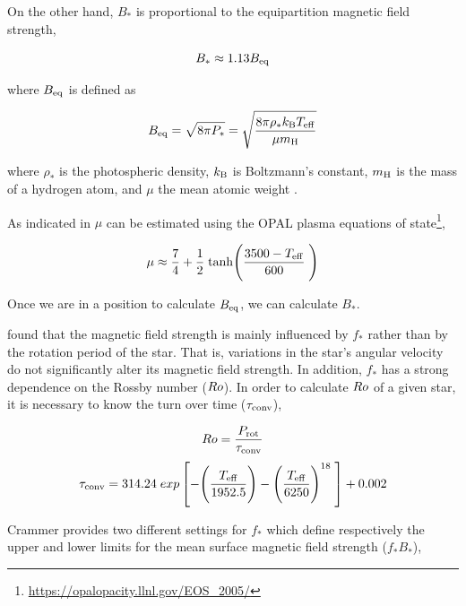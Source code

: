 \documentclass[fleqn,usenatbib]{mnras}
\begin{document}
On the other hand, $B_*$ is proportional to the equipartition magnetic field strength,
\begin{ceqn}
\begin{equation}
    B_* \approx 1.13 B_{\mathrm{eq}} \label{eq:mf_bstar}
\end{equation}
\end{ceqn}
where $B_{\mathrm{eq}}$ is defined as 
\begin{ceqn}
\begin{equation}
    B_{\mathrm{eq}} = \sqrt{8\pi P_*} = \sqrt{\frac{8\pi\rho_* k_{\mathrm{B}} T_{\mathrm{eff}}}{\mu m_{\mathrm{H}}}}\label{eq:mf_beq}    
\end{equation}
\end{ceqn}
where $\rho_*$ is the photospheric density, $k_{\mathrm{B}}$ is Boltzmann's constant, $m_{\mathrm{H}}$ is the mass of a hydrogen atom, and $\mu$ the mean atomic weight \citep{Cranmer2011}.

As indicated in \cite{Cranmer2011} $\mu$ can be estimated using the OPAL plasma equations of state\footnote{\url{https://opalopacity.llnl.gov/EOS_2005/}},
\begin{ceqn}
\begin{equation}
    \mu \approx \frac{7}{4} + \frac{1}{2} \; {\rm tanh}\Bigg(\frac{3500-T_{\mathrm{eff}}}{600}\;\Bigg) \label{eq:mf_atom_weight}
\end{equation}
\end{ceqn}
Once we are in a position to calculate $B_{\mathrm{eq}}$, we can calculate $B_*$.\par

\cite{Cranmer2011} found that the magnetic field strength is mainly influenced by $f_*$ rather than by the rotation period of the star. That is, variations in the star's angular velocity do not significantly alter its magnetic field strength. In addition, $f_*$ has a strong dependence on the Rossby number ($Ro$). In order to calculate $Ro$ of a given star, it is necessary to know the turn over time ($\tau_{\mathrm{conv}}$),
\begin{ceqn}
\begin{equation}
    Ro = \frac{P_{\mathrm{rot}}}{\tau_{\mathrm{conv}}} \label{eq:mf_rossby}
\end{equation}
\begin{equation}
    \tau_{\mathrm{conv}} = 314.24\;exp\left[-\Bigg(\frac{T_{\mathrm{eff}}}{1952.5}\Bigg)-\Bigg(\frac{T_{\mathrm{eff}}}{6250}\Bigg)^{18} \;\right]+0.002 \label{eq:mf_turnover}
\end{equation}
\end{ceqn}
\cite{Cranmer2011} Crammer provides two different settings for $f_*$ which define respectively the upper and lower limits for the mean surface magnetic field strength ($f_*B_*$),
\end{document}

